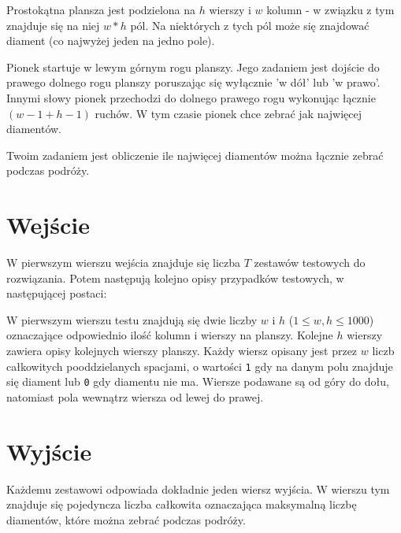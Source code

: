 \documentclass{spiral-kurs}
\begin{document}
\makeheader
%

Prostokątna plansza jest podzielona na $h$ wierszy i $w$
kolumn - w związku z tym znajduje się na niej $w*h$ pól. Na niektórych
z tych pól może się znajdować diament (co najwyżej jeden na jedno pole).

Pionek startuje w lewym górnym rogu planszy. Jego zadaniem jest dojście do
prawego dolnego rogu planszy poruszając się wyłącznie 'w dół' lub 'w prawo'. 
Innymi słowy pionek przechodzi do dolnego prawego rogu wykonując łącznie $(w-1 + h-1)$ ruchów. W tym czasie pionek
chce zebrać jak najwięcej diamentów.

Twoim zadaniem jest obliczenie ile najwięcej diamentów można łącznie zebrać
podczas podróży.

  
  \section{Wejście}

W pierwszym wierszu wejścia znajduje się liczba $T$ zestawów testowych do rozwiązania. Potem następują kolejno opisy przypadków testowych, w następującej postaci:

W pierwszym wierszu testu znajdują się dwie liczby $w$ i $h$
($1 \leq w, h \leq 1000$) oznaczające odpowiednio ilość kolumn i wierszy na
planszy.
Kolejne $h$ wierszy zawiera opisy kolejnych wierszy planszy. Każdy
wiersz opisany jest przez $w$ liczb całkowitych pooddzielanych spacjami,
o wartości \verb"1" gdy na danym polu znajduje się diament lub \verb"0" gdy diamentu nie ma.
Wiersze podawane są od góry do dołu, natomiast pola wewnątrz wiersza od lewej
do prawej.
  
  \section{Wyjście}
Każdemu zestawowi odpowiada dokładnie jeden wiersz wyjścia. W wierszu tym
znajduje się pojedyncza liczba całkowita oznaczająca maksymalną liczbę
diamentów, które można zebrać podczas podróży.


                                  


  
\end{document}
